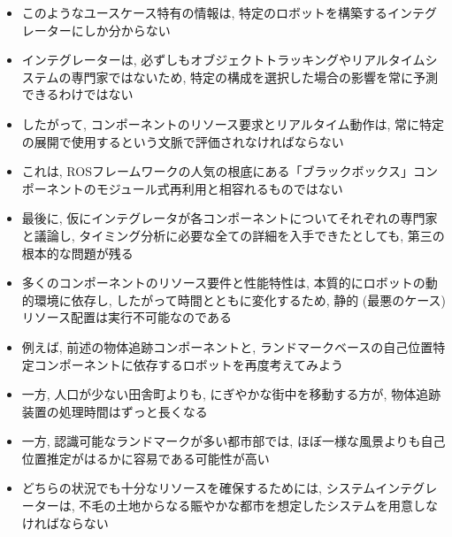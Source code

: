 \begin{frame}{}
    \begin{itemize}
        \item このようなユースケース特有の情報は, 特定のロボットを構築するインテグレーターにしか分からない
        \item インテグレーターは, 必ずしもオブジェクトトラッキングやリアルタイムシステムの専門家ではないため, 特定の構成を選択した場合の影響を常に予測できるわけではない
        \item したがって, コンポーネントのリソース要求とリアルタイム動作は, 常に特定の展開で使用するという文脈で評価されなければならない
        \item これは, ROSフレームワークの人気の根底にある「ブラックボックス」コンポーネントのモジュール式再利用と相容れるものではない
    \end{itemize}
\end{frame}

\begin{frame}{}
    \begin{itemize}
        \item 最後に, 仮にインテグレータが各コンポーネントについてそれぞれの専門家と議論し, タイミング分析に必要な全ての詳細を入手できたとしても, 第三の根本的な問題が残る
        \item 多くのコンポーネントのリソース要件と性能特性は, 本質的にロボットの動的環境に依存し, したがって時間とともに変化するため, 静的 (最悪のケース) リソース配置は実行不可能なのである
    \end{itemize}
\end{frame}

\begin{frame}{}
    \begin{itemize}
        \item 例えば, 前述の物体追跡コンポーネントと, ランドマークベースの自己位置特定コンポーネントに依存するロボットを再度考えてみよう
        \item 一方, 人口が少ない田舎町よりも, にぎやかな街中を移動する方が, 物体追跡装置の処理時間はずっと長くなる
        \item 一方, 認識可能なランドマークが多い都市部では, ほぼ一様な風景よりも自己位置推定がはるかに容易である可能性が高い
        \item どちらの状況でも十分なリソースを確保するためには, システムインテグレーターは, 不毛の土地からなる賑やかな都市を想定したシステムを用意しなければならない
    \end{itemize}
\end{frame}

